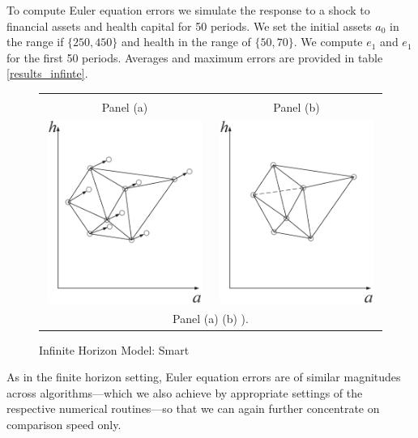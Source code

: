 \documentclass[a4paper,12pt]{article}%
\begin{document}
To compute Euler equation errors we simulate the response to a shock to financial assets and health capital for 50 periods. We set the initial assets $a_{0}$ in the range if $\{250,450\}$ and health in the range of $\{50,70\}$. We compute $e_{1}$ and $e_{1}$ for the first 50 periods. Averages and maximum errors are provided in table \ref{results_infinte}.

\begin{figure}[htb] \centering
\caption{Infinite Horizon Model: Smart}
\begin{tabular}
[c]{cc}
& \\
Panel (a) & Panel (b)\\
{\includegraphics[height=6.0cm, width=6.0cm]{Abbildungen/Smart_1.eps}} & {\includegraphics[height=6.0cm, width=6.0cm]{Abbildungen/Smart_2.eps}} \\
\multicolumn{2}{p{15cm}}{{\footnotesize Panel (a)  (b) ).}}
\end{tabular}
\label{graph_infinte copy(1)}
\end{figure}

As in the finite horizon setting, Euler equation errors are of similar magnitudes across algorithms---which we also achieve by appropriate settings of the respective numerical routines---so that we can again further concentrate on comparison speed only.
\end{document}
